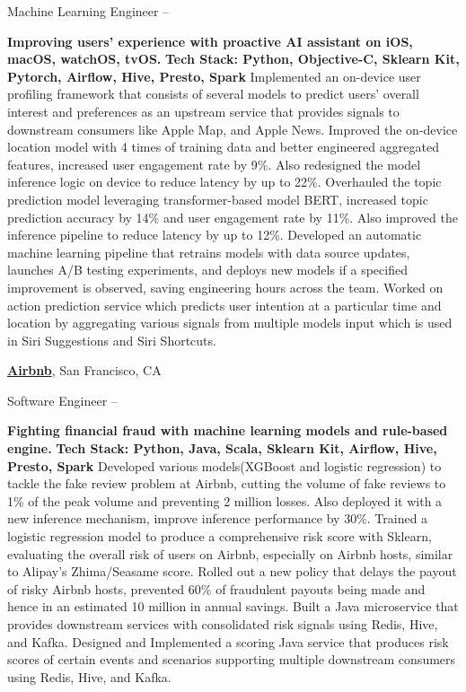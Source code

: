 \documentclass[a4paper,MMMyyyy,nonstopmode]{simpleresumecv}
\begin{document}
\begin{Body}
\Gap
\BulletItem
Machine Learning Engineer
\hfill
{} --
\begin{Detail}
\SubBulletItem
\textbf{Improving users' experience with proactive AI assistant on iOS, macOS, watchOS, tvOS.}
\SubBulletItem \textbf{Tech Stack: Python, Objective-C, Sklearn Kit, Pytorch, Airflow, Hive, Presto, Spark}
\SubBulletItem
Implemented an on-device user profiling framework that consists of several models to predict users' overall interest and preferences as an upstream service that provides signals to downstream consumers like Apple Map, and Apple News.
\SubBulletItem
Improved the on-device location model with 4 times of training data and better engineered aggregated features, increased user engagement rate by 9\%. Also redesigned the model inference logic on device to reduce latency by up to 22\%.
\SubBulletItem
Overhauled the topic prediction model leveraging transformer-based model BERT, increased topic prediction accuracy by 14\% and user engagement rate by 11\%. Also improved the inference pipeline to reduce latency by up to 12\%.
\SubBulletItem
Developed an automatic machine learning pipeline that retrains models with data source updates, launches A/B testing experiments, and deploys new models if a specified improvement is observed, saving engineering hours across the team.
\SubBulletItem
Worked on action prediction service which predicts user intention at a particular time and location by aggregating various signals from multiple models input which is used in Siri Suggestions and Siri Shortcuts.
\end{Detail}

\BigGap
\Entry
\href{https://press.airbnb.com/about-us/}
{\textbf{Airbnb}},
San Francisco, CA

\Gap
\BulletItem
Software Engineer
\hfill
{} --
\begin{Detail}
\SubBulletItem
\textbf{Fighting financial fraud with machine learning models and rule-based engine.}
\SubBulletItem \textbf{Tech Stack: Python, Java, Scala, Sklearn Kit, Airflow, Hive, Presto, Spark}
\SubBulletItem
Developed various models(XGBoost and logistic regression) to tackle the fake review problem at Airbnb, cutting the volume of fake reviews to 1\% of the peak volume and preventing 2 million losses. Also deployed it with a new inference mechanism, improve inference performance by 30\%.
\SubBulletItem
Trained a logistic regression model to produce a comprehensive risk score with Sklearn, evaluating the overall risk of users on Airbnb, especially on Airbnb hosts, similar to Alipay's Zhima/Seasame score.
\SubBulletItem
Rolled out a new policy that delays the payout of risky Airbnb hosts, prevented 60\% of fraudulent payouts being made and hence in an estimated 10 million in annual savings.
\SubBulletItem
Built a Java microservice that provides downstream services with consolidated risk signals using Redis, Hive, and Kafka.
\SubBulletItem
Designed and Implemented a scoring Java service that produces risk scores of certain events and scenarios supporting multiple downstream consumers using Redis, Hive, and Kafka.
\end{Detail}


\end{Body}
\end{document}
